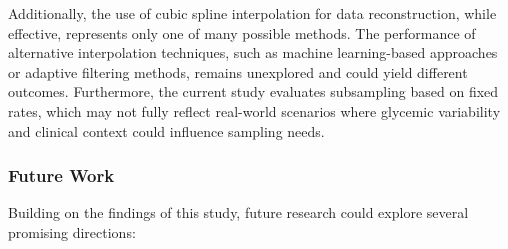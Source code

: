 Additionally, the use of cubic spline interpolation for data reconstruction, while effective, represents only one of many possible methods. The performance of alternative interpolation techniques, such as machine learning-based approaches or adaptive filtering methods, remains unexplored and could yield different outcomes. Furthermore, the current study evaluates subsampling based on fixed rates, which may not fully reflect real-world scenarios where glycemic variability and clinical context could influence sampling needs.

\subsubsection{Future Work}
Building on the findings of this study, future research could explore several promising directions:

